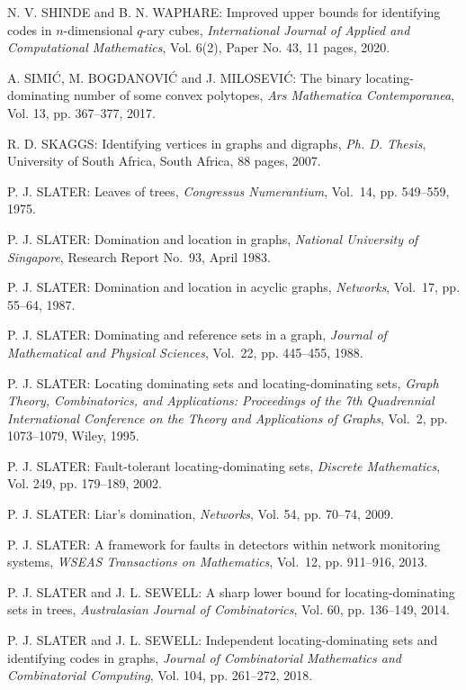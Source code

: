 \begin{thebibliography}{999}
N. V. SHINDE and B. N. WAPHARE: Improved upper bounds for identifying codes in $n$-dimensional $q$-ary cubes, {\it International Journal of Applied and Computational Mathematics}, Vol. 6(2), Paper No. 43, 11 pages, 2020.

A. SIMI\'C, M. BOGDANOVI\'C and J. MILOSEVI\'C: The binary locating-dominating number of some convex polytopes, {\it Ars Mathematica Contemporanea}, Vol. 13, pp. 367--377, 2017.

R. D. SKAGGS: Identifying vertices in graphs and digraphs, {\it Ph. D. Thesis}, University of South Africa, South Africa, 88 pages, 2007.

P. J. SLATER: Leaves of trees, {\it Congressus Numerantium}, Vol.~14, pp. 549--559, 1975.

P. J. SLATER: Domination and location in graphs, {\it National University of Singapore}, Research Report No.~93, April 1983.

P. J. SLATER: Domination and location in acyclic graphs, {\it Networks}, Vol.~17, pp. 55--64, 1987.

P. J. SLATER: Dominating and reference sets in a graph, {\it Journal of Mathematical and Physical Sciences}, Vol.~22, pp. 445--455, 1988.

P. J. SLATER: Locating dominating sets and locating-dominating sets, {\it Graph Theory, Combinatorics, and Applications: Proceedings of the 7th Quadrennial International Conference on the Theory and Applications of Graphs}, Vol.~2, pp. 1073--1079, Wiley, 1995.

P. J. SLATER: Fault-tolerant locating-dominating sets, {\it Discrete Mathematics}, Vol. 249, pp. 179--189, 2002.

P. J. SLATER: Liar's domination, {\it Networks}, Vol. 54, pp. 70--74, 2009.

P. J. SLATER: A framework for faults in detectors within network monitoring systems, {\it WSEAS Transactions on Mathematics}, Vol.~12, pp. 911--916, 2013.

P. J. SLATER and J. L. SEWELL: A sharp lower bound for locating-dominating sets in trees, {\it Australasian Journal of Combinatorics}, Vol. 60, pp. 136--149, 2014.

P. J. SLATER and J. L. SEWELL: Independent locating-dominating sets and identifying codes in graphs, {\it Journal of Combinatorial Mathematics and Combinatorial Computing}, Vol. 104, pp. 261--272, 2018.


\end{thebibliography}
